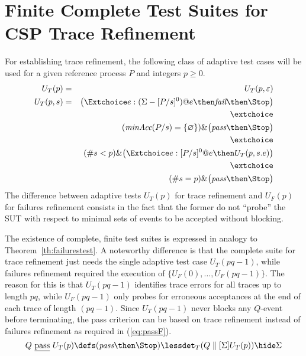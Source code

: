 \section{Finite Complete Test Suites for CSP Trace Refinement}
\label{sec:finitecomplete}

For establishing trace refinement, the following class of adaptive test cases
will be used for a given reference process $P$ and  integers $p \ge 0$.
%
\begin{eqnarray}
U_T(p) & = & U_T(p,\varepsilon)
\\
U_T(p,s) & = & \big(\Extchoice e:(\Sigma - [P/s]^0) @ e \then \efail\then \Stop \big)
\label{eq:uta}
\\ & & \extchoice \nonumber
\\ & & (\minaccs(P/s) = \{ \varnothing \})   \&   \big( \epass \then \Stop \big)
\label{eq:utb}
\\ & & \extchoice \nonumber
\\ & & (\#s < p) \& \big(\Extchoice e:[P/s]^0 @ e \then U_T(p,s.e) \big)
\label{eq:utc}
\\ & & \extchoice \nonumber
\\ & & (\#s = p) \& \big( \epass\then \Stop  \big)
\label{eq:utd}
\end{eqnarray}
%
The difference between adaptive tests $U_T(p)$ for trace refinement and
$U_F(p)$ for failures refinement consists in the fact that the former do not
``probe'' the SUT with respect to minimal sets of events to be accepted
without blocking.

The existence of complete, finite test suites is expressed in analogy to
Theorem~\ref{th:failurestest}. A noteworthy difference is that the complete
suite for trace refinement just needs the single adaptive test case
$U_T(pq-1)$, while failures refinement required the execution of $\{
U_F(0),\dots,U_F(pq-1)\}$. The reason for this is that $U_T(pq-1)$ identifies
trace errors for all traces up to length $pq$, while $U_F(pq-1)$ only probes
for erroneous acceptances at the end of each trace of length $(pq -1)$.
Since $U_T(pq-1)$ never blocks any $Q$-event before terminating, the pass 
criterion can be based on trace refinement instead of failures refinement
as required in (\ref{eq:passF}).
%
\begin{equation}
\label{eq:passT}
Q\ \pass\ U_T(p) \defs (\epass\then\Stop) \lessdet_T (Q\parallel[\Sigma] U_T(p)) \hide \Sigma
\end{equation}
%


